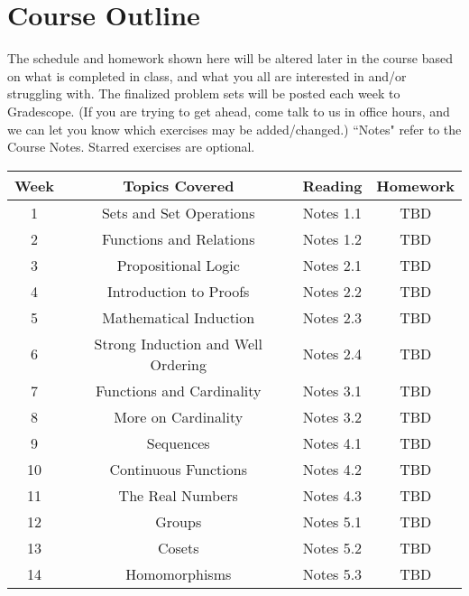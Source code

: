 \documentclass[11pt, a4paper]{article}
\begin{document}
\section*{Course Outline}
The schedule and homework shown here will be altered later in the course based on what is completed in class, and what you all are interested in and/or struggling with. The finalized problem sets will be posted each week to Gradescope. (If you are trying to get ahead, come talk to us in office hours, and we can let you know which exercises may be added/changed.) ``Notes" refer to the Course Notes. Starred exercises are optional.
\begin{center}
\begin{tabular}{|c|c|c|c|}
    \hline
     Week &  \qquad\qquad Topics Covered \qquad \qquad & Reading &Homework\\
     \hline
     1 & Sets and Set Operations & Notes 1.1 & TBD \\
     2 & Functions and Relations & Notes 1.2 & TBD \\
     3 & Propositional Logic & Notes 2.1 & TBD \\
     4 & Introduction to Proofs & Notes 2.2 & TBD \\
     5 & Mathematical Induction & Notes 2.3 & TBD \\
     6 & Strong Induction and Well Ordering & Notes 2.4 & TBD \\
     7 & Functions and Cardinality & Notes 3.1 & TBD \\
     8 & More on Cardinality & Notes 3.2 & TBD \\
     9 & Sequences & Notes 4.1 & TBD \\
     10 & Continuous Functions & Notes 4.2 & TBD \\
     11 & The Real Numbers & Notes 4.3 & TBD \\
     12 & Groups & Notes 5.1 & TBD \\
     13 & Cosets & Notes 5.2 & TBD \\
     14 & Homomorphisms & Notes 5.3 & TBD \\
     \hline
\end{tabular}
\end{center}
 
\end{document}
